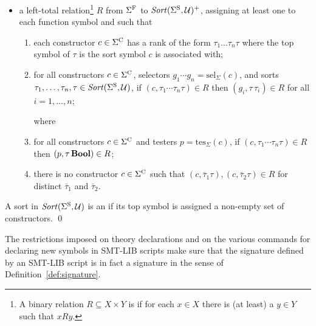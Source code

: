 \begin{definition}
\begin{itemize}
\item
a left-total  relation\footnote{%
A binary relation $R \subseteq X \times Y$ is 
if for each $x \in X$ there is (at least) a $y \in Y$ such that $xRy$.
}
$R$ from $\Sigma^\mathrm{F}$ to $\mathit{Sort}(\Sigma^\mathrm{S}, \mathcal{U})^+$,
assigning at least one  to each function symbol and
such that
\begin{enumerate}
%

\item 
each constructor $c \in \Sigma^\mathrm{C}$ has a rank of the form $\tau_1 \ldots \tau_n\tau$
where the top symbol of $\tau$ is the sort symbol $c$ is associated with;
\item
for all constructors $c \in \Sigma^\mathrm{C}$, 
selectors $g_1 \cdots g_n = \mathrm{sel}_\Sigma(c)$, and
sorts $\tau_1,\ldots,\tau_n,\tau \in \mathit{Sort}(\Sigma^\mathrm{S}, \mathcal{U})$,
if $(c, \tau_1\cdots\tau_n\tau) \in R$
then $(g_i,\tau\,\tau_i) \in R$ for all $i=1,\ldots,n$;

where 

\item
for all constructors $c \in \Sigma^\mathrm{C}$ and 
testers $p = \mathrm{tes}_\Sigma(c)$,
if $(c, \tau_1\cdots\tau_n\tau) \in R$
then $(p,\tau\,\textbf{Bool}) \in R$;

\item
there is no constructor $c \in \Sigma^\mathrm{C}$ such that
$(c, \bar{\tau}_1\tau), (c, \bar{\tau}_2\tau) \in R$ 
for distinct $\bar{\tau}_1$ and $\bar{\tau}_2$.
\end{enumerate}
\end{itemize}

A sort in $\mathit{Sort}(\Sigma^\mathrm{S}, \mathcal{U})$ is an 
if its top symbol is assigned a non-empty set of constructors.
\qed
\end{definition}

\begin{remark}
The restrictions imposed on theory declarations and on the various commands
for declaring new symbols in SMT-LIB scripts make sure that 
the signature defined by an SMT-LIB script is in fact a signature 
in the sense of Definition~\ref{def:signature}.
\end{remark}


